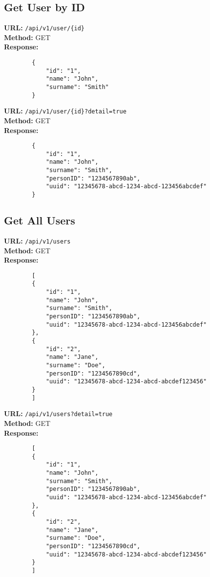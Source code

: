 \documentclass[12pt]{article}
\begin{document}
	\subsection{Get User by ID}

	\textbf{URL:} \texttt{/api/v1/user/\{id\}} \\
	\textbf{Method:} GET \\
	\textbf{Response:}
	\begin{verbatim}
		{
			"id": "1",
			"name": "John",
			"surname": "Smith"
		}
	\end{verbatim}

	\textbf{URL:} \texttt{/api/v1/user/\{id\}?detail=true} \\
	\textbf{Method:} GET \\
	\textbf{Response:}
	\begin{verbatim}
		{
			"id": "1",
			"name": "John",
			"surname": "Smith",
			"personID": "1234567890ab",
			"uuid": "12345678-abcd-1234-abcd-123456abcdef"
		}
	\end{verbatim}

	\newpage

	\subsection{Get All Users}

	\textbf{URL:} \texttt{/api/v1/users} \\
	\textbf{Method:} GET \\
	\textbf{Response:}
	\begin{verbatim}
		[
		{
			"id": "1",
			"name": "John",
			"surname": "Smith",
			"personID": "1234567890ab",
			"uuid": "12345678-abcd-1234-abcd-123456abcdef"
		},
		{
			"id": "2",
			"name": "Jane",
			"surname": "Doe",
			"personID": "1234567890cd",
			"uuid": "12345678-abcd-1234-abcd-abcdef123456"
		}
		]
	\end{verbatim}


	\textbf{URL:} \texttt{/api/v1/users?detail=true} \\
	\textbf{Method:} GET \\
	\textbf{Response:}
	\begin{verbatim}
		[
		{
			"id": "1",
			"name": "John",
			"surname": "Smith",
			"personID": "1234567890ab",
			"uuid": "12345678-abcd-1234-abcd-123456abcdef"
		},
		{
			"id": "2",
			"name": "Jane",
			"surname": "Doe",
			"personID": "1234567890cd",
			"uuid": "12345678-abcd-1234-abcd-abcdef123456"
		}
		]
	\end{verbatim}
\end{document}
